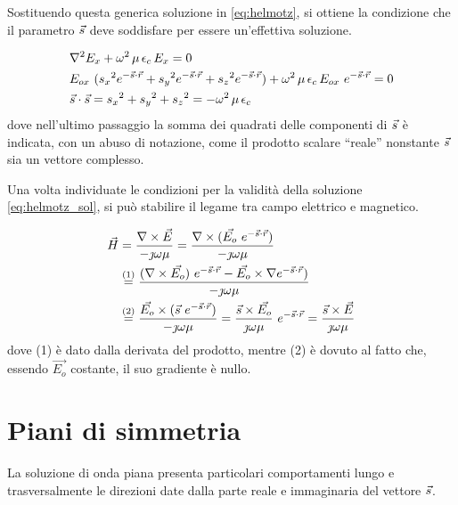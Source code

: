 	Sostituendo questa generica soluzione in \ref{eq:helmotz}, si ottiene la condizione che il parametro $\vec{s}$ deve soddisfare per essere un'effettiva soluzione.

	\begin{equation} \label{eq:condizione_s}
		\begin{split}
			& \nabla^2 E_x+ \omega^2 \, \mu \, \epsilon_c \, E_x = 0 \\
			& E_{ox} ~ ({s_x}^2 e^{-\vec{s} \cdot \vec{r}} +
				{s_y}^2 e^{-\vec{s} \cdot \vec{r}} +
				{s_z}^2 e^{-\vec{s} \cdot \vec{r}}) +
				\omega^2 \, \mu \, \epsilon_c \, E_{ox} ~ e^{-\vec{s} \cdot \vec{r}} = 0 \\
			& \vec{s} \cdot \vec{s} = {s_x}^2 + {s_y}^2 + {s_z}^2 = - \omega^2 \, \mu \, \epsilon_c
		\end{split}
	\end{equation}
	dove nell'ultimo passaggio la somma dei quadrati delle componenti di $\vec{s}$ è indicata, con un abuso di notazione, come il prodotto scalare ``reale'' nonstante $\vec{s}$ sia un vettore complesso.

	Una volta individuate le condizioni per la validità della soluzione \ref{eq:helmotz_sol}, si può stabilire il legame tra campo elettrico e magnetico.

	\begin{equation*}
		\begin{split}
			\vec{H} & = \frac {\nabla\times\vec{E}}{- \jmath \omega \mu} =
				\frac {\nabla\times(\vec{E_o} ~ e^{-\vec{s} \cdot \vec{r}})}{- \jmath \omega \mu}\\
			&\stackrel{(1)}{=} \frac {(\nabla\times\vec{E_o}) ~ e^{-\vec{s} \cdot \vec{r}} - \vec{E_o} \times \nabla e^{-\vec{s} \cdot \vec{r}})} {- \jmath \omega \mu} \\ &
			\stackrel{(2)}{=} \frac { \vec{E_o} \times ( \vec{s} ~ e^{-\vec{s} \cdot \vec{r}})} {- \jmath \omega \mu} = \frac { \vec{s} \times \vec{E_o}} {\jmath \omega \mu} ~ e^{-\vec{s} \cdot \vec{r}} = \frac { \vec{s} \times \vec{E}} {\jmath \omega \mu} \\
		\end{split}
	\end{equation*}
	dove (1) è dato dalla derivata del prodotto, mentre (2) è dovuto al fatto che, essendo $\vec{E_o}$ costante, il suo gradiente è nullo.

\section{Piani di simmetria}
	La soluzione di onda piana presenta particolari comportamenti lungo e trasversalmente le direzioni date dalla parte reale e immaginaria del vettore $\vec{s}$.

